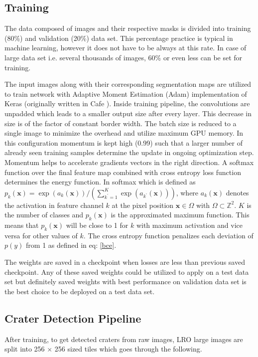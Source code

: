 \documentclass[11pt]{article}
\begin{document}
\subsection{Training}
The data composed of images and their respective masks is divided into training (80\%) and validation (20\%) data set. This percentage practice is typical in machine learning, however it does not have to be always at this rate. In case of large data set i.e. several thousands of images, 60\% or even less can be set for training.

The input images along with their corresponding segmentation maps are utilized to train network with Adaptive Moment Estimation (Adam) implementation of Keras (originally written in Cafe \cite{ronneberger2015u}). Inside training pipeline, the convolutions are unpadded which leads to a smaller output size after every layer. This decrease in size is of the factor of constant border width. The batch size is reduced to a single image to minimize the overhead and utilize maximum GPU memory. In this configuration momentum is kept high (0.99) such that a larger number of already seen training samples determine the update in ongoing optimization step. Momentum helps to accelerate gradients vectors in the right direction. A softmax function over the final feature map combined with cross entropy loss function determines the energy function. In softmax which is defined as $p_{k}(\mathbf{x})=\exp \left(a_{k}(\mathbf{x})\right) /\left(\sum_{k^{\prime}=1}^{K} \exp \left(a_{k^{\prime}}(\mathbf{x})\right)\right)$, where $a_{k}(\mathbf{x})$ denotes the activation in feature channel $k$ at the pixel position $\mathbf{x} \in \Omega$ with $\Omega \subset \mathbb{Z}^{2}$. $K$ is the number of classes and $p_{k}(\mathbf{x})$ is the approximated maximum function. This means that $p_{k}(\mathbf{x})$ will be close to 1 for $k$ with maximum activation and vice versa for other values of $k$. The cross entropy function penalizes each deviation of $p(y)$ from 1 as defined in eq: \ref{bce}.

The weights are saved in a checkpoint when losses are less than previous saved checkpoint. Any of these saved weights could be utilized to apply on a test data set but definitely saved weights with best performance on validation data set is the best choice to be deployed on a test data set.

\subsection{Crater Detection Pipeline}
After training, to get detected craters from raw images, LRO large images are split into 256 $\times$ 256 sized tiles which goes through the following.
\end{document}
